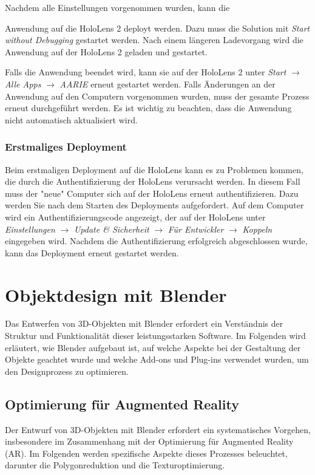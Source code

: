 Nachdem alle Einstellungen vorgenommen wurden, kann die

Anwendung auf die HoloLens 2 deployt werden. Dazu muss die Solution mit \textit{Start without Debugging} gestartet werden. Nach einem längeren Ladevorgang wird die Anwendung auf der HoloLens 2 geladen und gestartet.

Falls die Anwendung beendet wird, kann sie auf der HoloLens 2 unter \textit{Start} $\rightarrow$ \textit{Alle Apps} $\rightarrow$ \textit{AARIE} erneut gestartet werden. Falls Änderungen an der Anwendung auf den Computern vorgenommen wurden, muss der gesamte Prozess erneut durchgeführt werden. Es ist wichtig zu beachten, dass die Anwendung nicht automatisch aktualisiert wird.

\subsubsection{Erstmaliges Deployment}
Beim erstmaligen Deployment auf die HoloLens kann es zu Problemen kommen, die durch die Authentifizierung der HoloLens verursacht werden. In diesem Fall muss der "neue" Computer sich auf der HoloLens erneut authentifizieren. Dazu werden Sie nach dem Starten des Deployments aufgefordert. Auf dem Computer wird ein Authentifizierungscode angezeigt, der auf der HoloLens unter \textit{Einstellungen} $\rightarrow$ \textit{Update \& Sicherheit} $\rightarrow$ \textit{Für Entwickler} $\rightarrow$ \textit{Koppeln} eingegeben wird. Nachdem die Authentifizierung erfolgreich abgeschlossen wurde, kann das Deployment erneut gestartet werden.


\section{Objektdesign mit Blender} 
Das Entwerfen von 3D-Objekten mit Blender erfordert ein Verständnis der Struktur und Funktionalität dieser leistungsstarken
Software. Im Folgenden wird erläutert, wie Blender aufgebaut ist, auf welche Aspekte bei der Gestaltung der Objekte geachtet
wurde und welche Add-ons und Plug-ins verwendet wurden, um den Designprozess zu optimieren.

\subsection{Optimierung für Augmented Reality}
Der Entwurf von 3D-Objekten mit Blender erfordert ein systematisches Vorgehen, insbesondere im Zusammenhang mit der
Optimierung für Augmented Reality (AR). Im Folgenden werden spezifische Aspekte dieses Prozesses beleuchtet, darunter
die Polygonreduktion und die Texturoptimierung.

